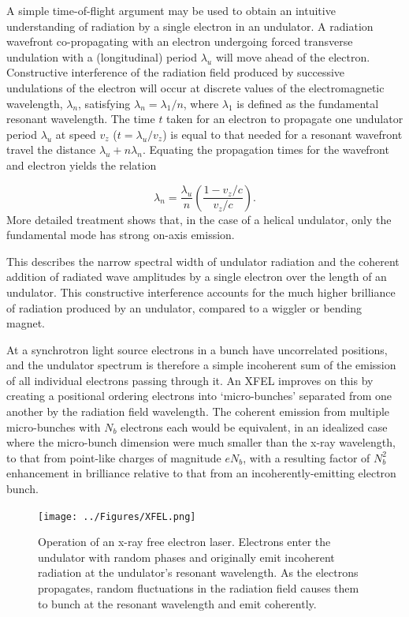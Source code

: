 \documentclass [11pt, proquest, article] {uwthesis}[2016/11/22]
\begin{document}
A simple time-of-flight argument may be used to obtain an intuitive understanding of radiation by a single electron in an undulator. A radiation wavefront co-propagating with an electron undergoing forced transverse undulation with a (longitudinal) period $\lambda_u$ will move ahead of the electron. Constructive interference of the radiation field produced by successive undulations of the electron will occur at discrete values of the electromagnetic wavelength, $\lambda_n$, satisfying $\lambda_n = \lambda_1 / n$, where $\lambda_1$ is defined as the fundamental resonant wavelength. The time $t$ taken for an electron to propagate one undulator period $\lambda_u$ at speed $v_z$ ($t = \lambda_u/v_z$) is equal to that needed for a resonant wavefront travel the distance $\lambda_u + n \lambda_n$. Equating the propagation times for the wavefront and electron yields the relation \cite{mcneil2010x} 

\begin{equation}
\lambda_n = \frac{\lambda_u}{n}(\frac{1 - v_z/c}{v_z/c}).
\end{equation}
More detailed treatment shows that, in the case of a helical undulator, only the fundamental mode has strong on-axis emission. \cite{PhysRevLett.100.174801}

This describes the narrow spectral width of undulator radiation and the coherent addition of radiated wave amplitudes by a single electron over the length of an undulator. This constructive interference accounts for the much higher brilliance of radiation produced by an undulator, compared to a wiggler or bending magnet. 

At a synchrotron light source electrons in a bunch have uncorrelated positions, and the undulator spectrum is therefore a simple incoherent sum of the emission of all individual electrons passing through it. An XFEL improves on this by creating a positional ordering electrons into `micro-bunches' separated from one another by the radiation field wavelength. The coherent emission from multiple micro-bunches with $N_b$ electrons each would be equivalent, in an idealized case where the micro-bunch dimension were much smaller than the x-ray wavelength, to that from point-like charges of magnitude $e N_b$, with a resulting factor of $N_b^2$ enhancement in brilliance relative to that from an incoherently-emitting electron bunch.%


\begin{figure}[h] 
\caption{Operation of an x-ray free electron laser.\cite{mcneil2010x} Electrons enter the undulator with random phases and originally emit incoherent radiation at the undulator's resonant wavelength. As the electrons propagates, random fluctuations in the radiation field causes them to bunch at the resonant wavelength and emit coherently.}
\label{fig:xfel}
\centering
\texttt{[image: ../Figures/XFEL.png]}
\end{figure}
\end{document}
